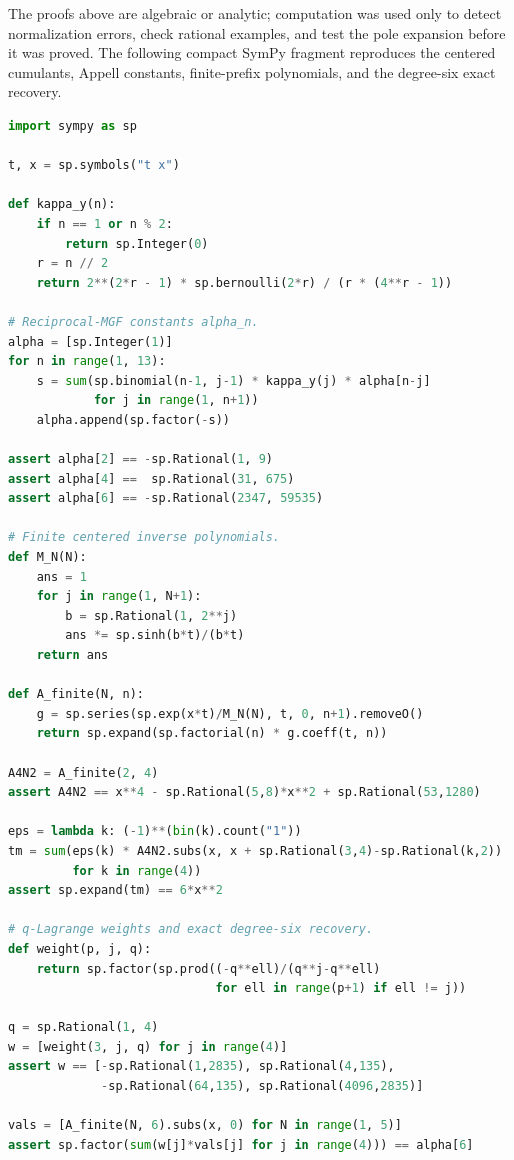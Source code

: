 \documentclass[11pt,oneside]{article}
\theoremstyle{frontier}
\theoremstyle{definition}
\theoremstyle{remark}
\begin{document}
The proofs above are algebraic or analytic; computation was used only to detect normalization errors,
check rational examples, and test the pole expansion before it was proved.  The following compact
SymPy fragment reproduces the centered cumulants, Appell constants, finite-prefix polynomials, and
the degree-six exact recovery.

\begin{lstlisting}[style=frontiercode,language=Python,caption={Exact symbolic checks for the centered Appell sequence.}]
import sympy as sp

t, x = sp.symbols("t x")

def kappa_y(n):
    if n == 1 or n % 2:
        return sp.Integer(0)
    r = n // 2
    return 2**(2*r - 1) * sp.bernoulli(2*r) / (r * (4**r - 1))

# Reciprocal-MGF constants alpha_n.
alpha = [sp.Integer(1)]
for n in range(1, 13):
    s = sum(sp.binomial(n-1, j-1) * kappa_y(j) * alpha[n-j]
            for j in range(1, n+1))
    alpha.append(sp.factor(-s))

assert alpha[2] == -sp.Rational(1, 9)
assert alpha[4] ==  sp.Rational(31, 675)
assert alpha[6] == -sp.Rational(2347, 59535)

# Finite centered inverse polynomials.
def M_N(N):
    ans = 1
    for j in range(1, N+1):
        b = sp.Rational(1, 2**j)
        ans *= sp.sinh(b*t)/(b*t)
    return ans

def A_finite(N, n):
    g = sp.series(sp.exp(x*t)/M_N(N), t, 0, n+1).removeO()
    return sp.expand(sp.factorial(n) * g.coeff(t, n))

A4N2 = A_finite(2, 4)
assert A4N2 == x**4 - sp.Rational(5,8)*x**2 + sp.Rational(53,1280)

eps = lambda k: (-1)**(bin(k).count("1"))
tm = sum(eps(k) * A4N2.subs(x, x + sp.Rational(3,4)-sp.Rational(k,2))
         for k in range(4))
assert sp.expand(tm) == 6*x**2

# q-Lagrange weights and exact degree-six recovery.
def weight(p, j, q):
    return sp.factor(sp.prod((-q**ell)/(q**j-q**ell)
                             for ell in range(p+1) if ell != j))

q = sp.Rational(1, 4)
w = [weight(3, j, q) for j in range(4)]
assert w == [-sp.Rational(1,2835), sp.Rational(4,135),
             -sp.Rational(64,135), sp.Rational(4096,2835)]

vals = [A_finite(N, 6).subs(x, 0) for N in range(1, 5)]
assert sp.factor(sum(w[j]*vals[j] for j in range(4))) == alpha[6]
\end{lstlisting}
\end{document}
